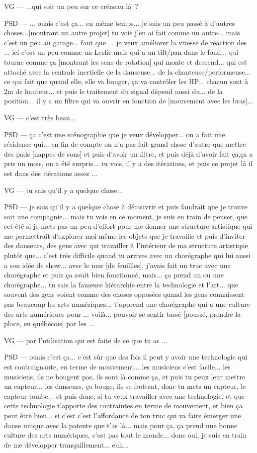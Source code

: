 VG — ...qui soit un peu sur ce créneau là ? 

PSD — ... ouais c'est ça... en même temps... je suis un peu passé à d'autres choses...[montrant un autre projet]  tu vois j'en ai fait comme un autre... mais c'est un peu au garage... faut que ... je veux améliorer la vitesse de réaction des ... ici c'est un peu comme un Leslie  mais qui a un tilt/pan dans le fond... qui tourne comme ça [montrant les sens de rotation] qui monte et descend... qui est attaché avec la centrale inertielle de la danseuse... de la chanteuse/performeuse... ce qui fait que quand elle, elle va bouger, ça va contrôler les HP... chacun sont à 2m de hauteur... et puis le traitement du signal dépend aussi du... de la position... il y a un filtre qui va ouvrir en fonction de [mouvement avec les bras]... 

VG — c'est très beau... 

PSD — ça c'est une scénographie que je veux développer... on a fait une résidence qui... en fin de compte on n'a pas fait grand chose d'autre que mettre des pads [nappes de sons] et puis d'avoir un filtre, et puis déjà d'avoir fait ça,ça a pris un mois, on a été surpris... tu vois, il y a des itérations, et puis ce projet là il est dans des itérations assez ... 

VG — tu sais qu'il y a quelque chose... 

PSD — je sais qu'il y a quelque chose à découvrir et puis faudrait que je trouve soit une compagnie... mais tu vois en ce moment, je suis en train de penser, que cet été si je mets pas un peu d'effort pour me donner une structure artistique qui me permettrait d'explorer moi-même les objets que je travaille et puis d'inviter des danseurs, des gens avec qui travailler à l'intérieur de ma structure artistique plutôt que... c'est très difficile quand tu arrives avec un chorégraphe qui lui aussi a son idée de show... avec le mur [de feuillles], j'avais fait un truc avec une chorégraphe et puis ça avait bien fonctionné, mais... ça prend un ou une chorégraphe... tu sais la fameuse hiérarchie entre la technologie et l'art... que souvent des gens voient comme des choses opposées quand les gens connaissent pas beaucoup les arts numériques... t'apprend une chorégraphe qui a une culture des arts numériques pour ... voilà... pouvoir se sentir tassé [poussé, prendre la place, en québécois]  par les ... 

VG — par l'utilisation qui est faite de ce que tu as ... 

PSD — ouais c'est ça... c'est sûr que des fois il peut y avoir une technologie qui est contraignante, en terme de mouvement... les musiciens c'est facile... les musiciens, ils ne bougent pas, ils sont là comme ça, et puis  tu peux leur mettre un capteur... les danseurs, ça bouge, ils se frottent, donc tu mets un capteur, le capteur tombe... et puis donc, si tu veux travailler avec une technologie, et que cette technologie t'apporte des contraintes en terme de mouvement, et bien ça peut être bien... si c'est c'est l'affordance de ton truc qui va faire émerger une danse unique avec la patente que t'as là... mais pour ça, ça prend une bonne culture des arts numériques, c'est pas tout le monde... donc oui, je suis en train de me développer tranquillement... euh... 


